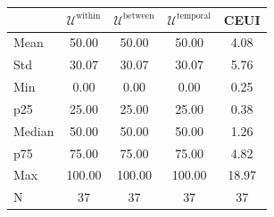 \begin{tabular}{lcccc}
\toprule
 & $\mathcal{U}^{\text{within}}$ & $\mathcal{U}^{\text{between}}$ & $\mathcal{U}^{\text{temporal}}$ & CEUI \\
\midrule
Mean & 50.00 & 50.00 & 50.00 & 4.08 \\
Std & 30.07 & 30.07 & 30.07 & 5.76 \\
Min & 0.00 & 0.00 & 0.00 & 0.25 \\
p25 & 25.00 & 25.00 & 25.00 & 0.38 \\
Median & 50.00 & 50.00 & 50.00 & 1.26 \\
p75 & 75.00 & 75.00 & 75.00 & 4.82 \\
Max & 100.00 & 100.00 & 100.00 & 18.97 \\
N & 37 & 37 & 37 & 37 \\
\bottomrule
\end{tabular}
